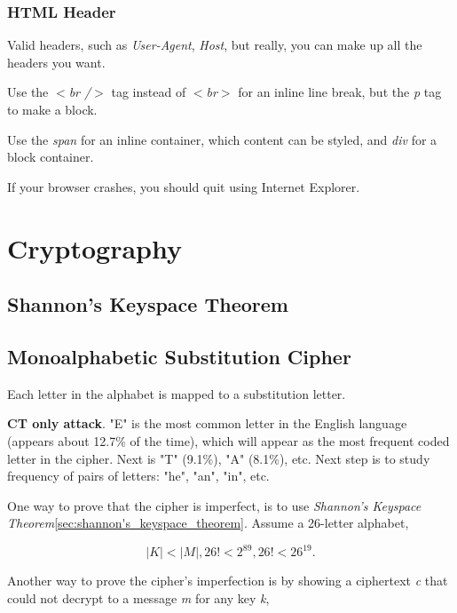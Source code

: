 \documentclass[12pt]{article}
\begin{document}
\subsubsection*{HTML Header}
Valid headers, such as \emph{User-Agent}, \emph{Host}, but really, you can make up all the headers you want.

Use the \emph{$<$br /$>$} tag instead of \emph{$<$br$>$} for an inline line break, but the \emph{p} tag to make a block.

Use the \emph{span} for an inline container, which content can be styled, and \emph{div} for a block container.

If your browser crashes, you should quit using Internet Explorer.

\section*{Cryptography}

\subsection*{Shannon's Keyspace Theorem}
\label{sec:shannon's_keyspace_theorem}

\subsection*{Monoalphabetic Substitution Cipher}

Each letter in the alphabet is mapped to a substitution letter.

\textbf{CT only attack}. "E" is the most common letter in the English language (appears about 12.7\% of the time), which will appear as the most frequent coded letter in the cipher. Next is "T" (9.1\%), "A" (8.1\%), etc. Next step is to study frequency of pairs of letters: "he", "an", "in", etc.

One way to prove that the cipher is imperfect, is to use \emph{Shannon's Keyspace Theorem}\ref{sec:shannon's_keyspace_theorem}. Assume a 26-letter alphabet,

\begin{equation}
|K| < |M|, 26! < 2^{89}, 26! < 26^{19}.
\end{equation}

Another way to prove the cipher's imperfection is by showing a ciphertext \emph{c} that could not decrypt to a message \emph{m} for any key \emph{k},
\end{document}
